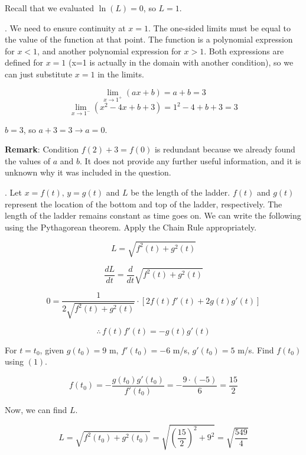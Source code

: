 \documentclass{article}
\begin{document}
\hfill

\noindent Recall that we evaluated $\ln(L) = 0$, so $\boxed{L = 1}$.

\hfill

. We need to ensure continuity at $x=1$. The one-sided limits must be equal to the value of the function at that point. The function is a polynomial expression for $x<1$, and another polynomial expression for $x>1$. Both expressions are defined for $x=1$ (x=1 is actually in the domain with another condition), so we can just substitute $x=1$ in the limits.

\[\lim_{x\to1^+} (ax+b) = a+b = 3\]
\[\lim_{x\to1^-} (x^2-4x+b+3) = 1^2 -4 +b+3 =  3\]

\noindent $\boxed{b=3}$, so $a+3 = 3\rightarrow \boxed{a = 0}$.

\hfill

\noindent \textbf{Remark}: Condition $f(2) + 3 = f(0)$ is redundant because we already found the values of $a$ and $b$. It does not provide any further useful information, and it is unknown why it was included in the question.

\hfill

. Let $x = f(t), \,y = g(t)$ and $L$ be the length of the ladder. $f(t)$ and $g(t)$ represent the location of the bottom and top of the ladder, respectively. The length of the ladder remains constant as time goes on. We can write the following using the Pythagorean theorem. Apply the Chain Rule appropriately.

\[L = \sqrt{f^2(t) + g^2(t)}\]

\[\frac{dL}{dt} = \frac{d}{dt}\sqrt{f^2(t) + g^2(t)}\]

\[0 = \frac{1}{2\sqrt{f^2(t)+g^2(t)}} \cdot [2f(t)f'(t) + 2g(t)g'(t)]\]

\begin{equation}\therefore \, f(t)f'(t) = -g(t)g'(t)\end{equation}

\hfill

\noindent For $t=t_0$, given $g(t_0) = 9$ m, $f'(t_0) = -6$ m/s, $g'(t_0) = 5$ m/s. Find $f(t_0)$ using $(1)$.

\[f(t_0) = -\frac{g(t_0)g'(t_0)}{f'(t_0)} = -\frac{9\cdot (-5)}{6} = \frac{15}{2}\]

\noindent Now, we can find $L$.

\[L =\sqrt{f^2(t_0) + g^2(t_0)} = \sqrt{\left(\frac{15}{2}\right)^2 + 9^2} = \sqrt{\frac{549}{4}}\]

\hfill
\end{document}
